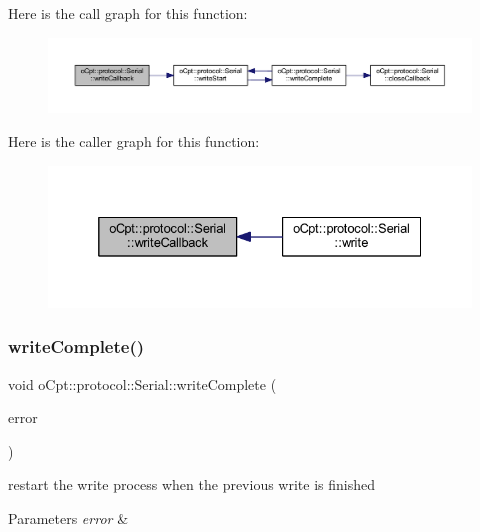 Here is the call graph for this function\+:\nopagebreak
\begin{figure}[H]
\begin{center}
\leavevmode
\includegraphics[width=350pt]{classo_cpt_1_1protocol_1_1_serial_a02f091d3e3333bc1f723216cbeb757af_cgraph}
\end{center}
\end{figure}
Here is the caller graph for this function\+:\nopagebreak
\begin{figure}[H]
\begin{center}
\leavevmode
\includegraphics[width=332pt]{classo_cpt_1_1protocol_1_1_serial_a02f091d3e3333bc1f723216cbeb757af_icgraph}
\end{center}
\end{figure}
\hypertarget{classo_cpt_1_1protocol_1_1_serial_a8b1037a2eefdd4215f1d4732e168272c}{}\label{classo_cpt_1_1protocol_1_1_serial_a8b1037a2eefdd4215f1d4732e168272c} 
\subsubsection{\texorpdfstring{write\+Complete()}{writeComplete()}}
{\footnotesize\ttfamily void o\+Cpt\+::protocol\+::\+Serial\+::write\+Complete (\begin{DoxyParamCaption}\item[{const boost\+::system\+::error\+\_\+code \&}]{error }\end{DoxyParamCaption})\hspace{0.3cm}{\ttfamily [protected]}}

restart the write process when the previous write is finished 
\begin{DoxyParams}{Parameters}
{\em error} & \\
\hline
\end{DoxyParams}


